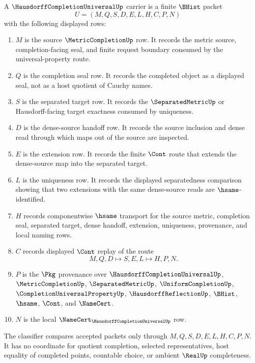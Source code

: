 \begin{definition}
\label{def:hausdorff-completion-universal-carrier}
A $\HausdorffCompletionUniversalUp$ carrier is a finite $\BHist$ packet
$$
U=(M,Q,S,D,E,L,H,C,P,N)
$$
with the following displayed rows:
\begin{enumerate}
\item $M$ is the source $\MetricCompletionUp$ row. It records the metric source, completion-facing seal, and finite request boundary consumed by the universal-property route.
\item $Q$ is the completion seal row. It records the completed object as a displayed seal, not as a host quotient of Cauchy names.
\item $S$ is the separated target row. It records the $\SeparatedMetricUp$ or Hausdorff-facing target exactness consumed by uniqueness.
\item $D$ is the dense-source handoff row. It records the source inclusion and dense read through which maps out of the source are inspected.
\item $E$ is the extension row. It records the finite $\Cont$ route that extends the dense-source map into the separated target.
\item $L$ is the uniqueness row. It records the displayed separatedness comparison showing that two extensions with the same dense-source reads are $\hsame$-identified.
\item $H$ records componentwise $\hsame$ transport for the source metric, completion seal, separated target, dense handoff, extension, uniqueness, provenance, and local naming rows.
\item $C$ records displayed $\Cont$ replay of the route
$$
M,Q,D \longmapsto S,E,L \longmapsto H,P,N .
$$
\item $P$ is the $\Pkg$ provenance over $\HausdorffCompletionUniversalUp$, $\MetricCompletionUp$, $\SeparatedMetricUp$, $\UniformCompletionUp$, $\CompletionUniversalPropertyUp$, $\HausdorffReflectionUp$, $\BHist$, $\hsame$, $\Cont$, and $\NameCert$.
\item $N$ is the local $\NameCert_{\HausdorffCompletionUniversalUp}$ row.
\end{enumerate}
The classifier compares accepted packets only through $M,Q,S,D,E,L,H,C,P,N$. It has no coordinate for quotient completion, selected representatives, host equality of completed points, countable choice, or ambient $\RealUp$ completeness.
\end{definition}

